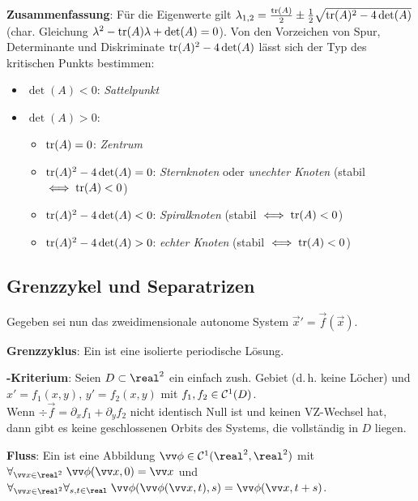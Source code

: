 \textbf{Zusammenfassung}:
Für die Eigenwerte gilt
$\lambda_{1,2} = \frac{\text{tr}(A)}{2} \pm \frac{1}{2} \sqrt{\text{tr}(A)^2 - 4\det(A)}$
(char. Gleichung $\lambda^2 - \text{tr}(A) \lambda + \det(A) = 0$).
Von den Vorzeichen von Spur, Determinante und Diskriminate $\text{tr}(A)^2 - 4\det(A)$ lässt sich der
Typ des kritischen Punkts bestimmen:
\begin{itemize}
    \item
    $\det(A) < 0$: \emph{Sattelpunkt}
    
    \item
    $\det(A) > 0$:
    \begin{itemize}
        \item
        $\text{tr}(A) = 0$: \emph{Zentrum}
        
        \item
        $\text{tr}(A)^2 - 4\det(A) = 0$: \emph{Sternknoten} oder \emph{unechter Knoten}
        (stabil $\iff \text{tr}(A) < 0$)
        
        \item
        $\text{tr}(A)^2 - 4\det(A) < 0$: \emph{Spiralknoten} (stabil $\iff \text{tr}(A) < 0$)
        
        \item
        $\text{tr}(A)^2 - 4\det(A) > 0$: \emph{echter Knoten} (stabil $\iff \text{tr}(A) < 0$)
    \end{itemize}
\end{itemize}

\pagebreak

\subsection{%
    Grenzzykel und Separatrizen%
}

Gegeben sei nun das zweidimensionale autonome System $\vec{x}' = \vec{f}(\vec{x})$.

\textbf{Grenzzyklus}:
Ein  ist eine isolierte periodische Lösung.

\textbf{-Kriterium}:
Seien $D \subset \real^2$ ein einfach zush. Gebiet (d.\,h. keine Löcher) und\\
$x' = f_1(x, y)$, $y' = f_2(x, y)$ mit $f_1, f_2 \in \mathcal{C}^1(D)$.\\
Wenn $\div \vec{f} = \partial_x f_1 + \partial_y f_2$ nicht identisch Null ist und
keinen VZ-Wechsel hat, dann gibt es keine geschlossenen Orbits des Systems, die vollständig
in $D$ liegen.

\linie

\textbf{Fluss}:
Ein  ist eine Abbildung $\vec{\phi} \in \C^1(\real^2, \real^2)$ mit
$\forall_{\vec{x} \in \real^2}\; \vec{\phi}(\vec{x}, 0) = \vec{x}$ und\\
$\forall_{\vec{x} \in \real^2} \forall_{s, t \in \real}\;
\vec{\phi}(\vec{\phi}(\vec{x}, t), s) = \vec{\phi}(\vec{x}, t+s)$.

